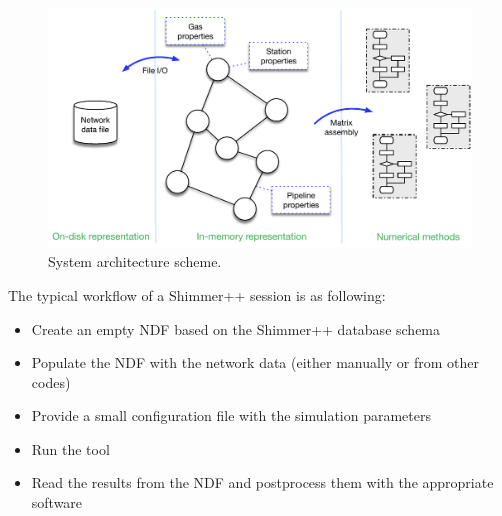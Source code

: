 \begin{figure}[H]
    \centering
    \includegraphics[scale = 0.7]{img_intro/system_arch.pdf}  
    \caption{System architecture scheme.}
    \label{intro:architecture}
\end{figure}

The typical workflow of a Shimmer++ session is as following:
\begin{itemize}
    \item Create an empty NDF based on the Shimmer++ database schema
    \item Populate the NDF with the network data (either manually or from other codes)
    \item Provide a small configuration file with the simulation parameters
    \item Run the tool
    \item Read the results from the NDF and postprocess them with the appropriate software
\end{itemize}
